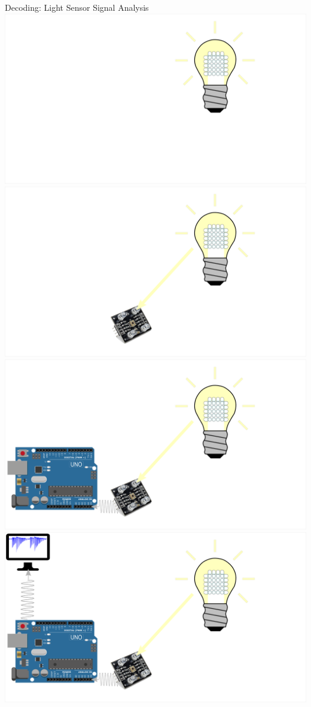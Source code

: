 \documentclass[11pt,t,usepdftitle=false,aspectratio=169]{beamer}
\begin{document}
\begin{frame}{Decoding: Light Sensor Signal Analysis}
     {
        \centering
        \includegraphics{img/Decoding_1.png}
    }
     {
        \centering
        \includegraphics{img/Decoding_2.png}
    }
     {
        \centering
        \includegraphics{img/Decoding_3.png}
    }
     {
        \centering
        \includegraphics{img/Decoding_4.png}
}
\end{frame}
\end{document}
